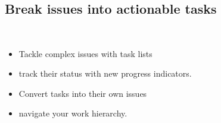 \subsection{Break issues into actionable tasks}

\begin{frame}
  \frametitle{\insertsectionhead}
  \framesubtitle{\insertsubsectionhead}
  \begin{columns}
    \begin{itemize}
      \item Tackle complex issues with task lists 
      \item track their status with new progress indicators. 
      \item Convert tasks into their own issues 
      \item navigate your work hierarchy.
  \end{itemize}

\end{columns}
\end{frame}
